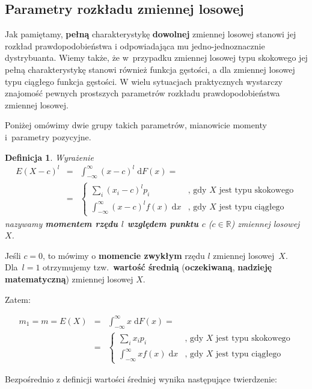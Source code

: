 \documentclass[10pt,a4paper]{article}
\newtheorem{definition}{Definicja}[section]
\newcommand{\dd}{\; \mathrm{d}}
\begin{document}
\subsection{Parametry rozkładu zmiennej losowej}
Jak pamiętamy, \textbf{pełną} charakterystykę \textbf{dowolnej} zmiennej losowej
stanowi jej rozkład prawdopodobieństwa i odpowiadająca mu jedno-jednoznacznie
dystrybuanta. Wiemy także, że w~przypadku zmiennej losowej typu skokowego jej
pełną charakterystykę stanowi również funkcja gęstości, a dla zmiennej losowej
typu ciągłego funkcja gęstości.  W wielu sytuacjach praktycznych wystarczy
znajomość pewnych prostszych parametrów rozkładu prawdopodobieństwa zmiennej
losowej.

Poniżej omówimy dwie grupy takich parametrów, mianowicie momenty i~parametry
pozycyjne.

\begin{definition}
  Wyrażenie
  \begin{eqnarray}
    E(X-c)^l &= & \int_{-\infty}^{\infty}(x-c)^l\dd{F(x)} = \\
    \nonumber
    &= & \begin{cases}
      \sum_i(x_i-c)^lp_i & \textrm{, gdy $X$ jest typu skokowego} \\
      \int_{-\infty}^{\infty}(x-c)^lf(x)\dd{x} & \textrm{, gdy $X$ jest typu ciągłego}
    \end{cases}
  \end{eqnarray}
  nazywamy \textbf{momentem rzędu $l$ względem punktu $c$} ($c \in \mathbb{R}$)
  zmiennej losowej $X$.
\end{definition}

Jeśli $c=0$, to mówimy o \textbf{momencie zwykłym} rzędu $l$ zmiennej
losowej~$X$. Dla~$l=1$ otrzymujemy tzw.~\textbf{wartość średnią}
(\textbf{oczekiwaną}, \textbf{nadzieję matematyczną}) zmiennej losowej $X$.

Zatem:

\begin{eqnarray}
  m_1 = m = E(X) & = & \int_{-\infty}^{\infty}x\dd{F(x)} = \\
  \nonumber
  & = & \begin{cases}
    \sum_ix_ip_i & \textrm{, gdy $X$ jest typu skokowego}\\
    \int_{-\infty}^{\infty}xf(x)\dd{x} & \textrm{, gdy $X$ jest typu ciągłego}
  \end{cases}
\end{eqnarray}

Bezpośrednio z definicji wartości średniej wynika następujące twierdzenie:
\end{document}
